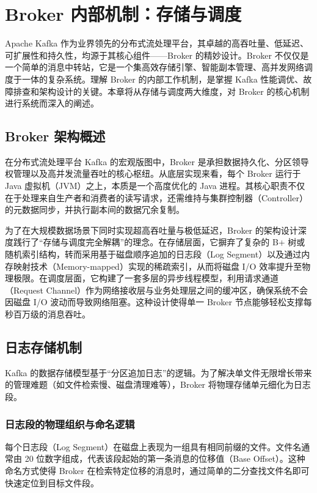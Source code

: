 \section{Broker 内部机制：存储与调度}
Apache Kafka 作为业界领先的分布式流处理平台，其卓越的高吞吐量、低延迟、可扩展性和持久性，均源于其核心组件——Broker 的精妙设计。Broker 不仅仅是一个简单的消息中转站，它是一个集高效存储引擎、智能副本管理、高并发网络调度于一体的复杂系统。理解 Broker 的内部工作机制，是掌握 Kafka 性能调优、故障排查和架构设计的关键。本章将从存储与调度两大维度，对 Broker 的核心机制进行系统而深入的阐述。

\subsection{Broker 架构概述}
在分布式流处理平台 Kafka 的宏观版图中，Broker 是承担数据持久化、分区领导权管理以及高并发流量吞吐的核心枢纽。从底层实现来看，每个 Broker 运行于 Java 虚拟机（JVM）之上，本质是一个高度优化的 Java 进程。其核心职责不仅在于处理来自生产者和消费者的读写请求，还需维持与集群控制器（Controller）的元数据同步，并执行副本间的数据冗余复制。

为了在大规模数据场景下同时实现超高吞吐量与极低延迟，Broker 的架构设计深度践行了“存储与调度完全解耦”的理念。在存储层面，它摒弃了复杂的 B+ 树或随机索引结构，转而采用基于磁盘顺序追加的日志段（Log Segment）以及通过内存映射技术（Memory-mapped）实现的稀疏索引，从而将磁盘 I/O 效率提升至物理极限。在调度层面，它构建了一套多层的异步线程模型，利用请求通道（Request Channel）作为网络接收层与业务处理层之间的缓冲区，确保系统不会因磁盘 I/O 波动而导致网络阻塞。这种设计使得单一 Broker 节点能够轻松支撑每秒百万级的消息吞吐。

\subsection{日志存储机制}
Kafka 的数据存储模型基于“分区追加日志”的逻辑。为了解决单文件无限增长带来的管理难题（如文件检索慢、磁盘清理难等），Broker 将物理存储单元细化为日志段。

\subsubsection{日志段的物理组织与命名逻辑}
每个日志段（Log Segment）在磁盘上表现为一组具有相同前缀的文件。文件名通常由 20 位数字组成，代表该段起始的第一条消息的位移值（Base Offset）。这种命名方式使得 Broker 在检索特定位移的消息时，通过简单的二分查找文件名即可快速定位到目标文件段。

